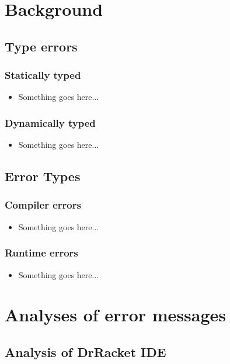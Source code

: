\documentclass{beamer}
\begin{document}
\section[Background]{Background}

\subsection{Type errors}

\begin{frame}
  \frametitle{Statically typed}
	\begin{itemize}
		\item Something goes here...
	\end{itemize}
\end{frame}

\begin{frame}
  \frametitle{Dynamically typed}
	\begin{itemize}
		\item Something goes here...
	\end{itemize}
\end{frame}

\subsection{Error Types}

\begin{frame}
	\frametitle{Compiler errors}
		\begin{itemize}
			\item Something goes here...
		\end{itemize}
\end{frame}

\begin{frame}
	\frametitle{Runtime errors}
		\begin{itemize}
			\item Something goes here...
		\end{itemize}

\end{frame}

\section[Analyses]{Analyses of error messages}

\subsection[DrRacket Analysis]{Analysis of DrRacket IDE}
\end{document}
